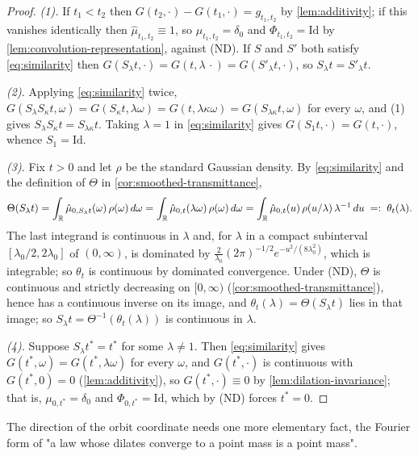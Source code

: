 \begin{proof}
\leanok
\emph{(1).} If $t_1 < t_2$ then $G(t_2,\cdot) - G(t_1,\cdot) = g_{t_1,t_2}$ by
\ref{lem:additivity}; if this vanishes identically then $\hat\mu_{t_1,t_2} \equiv 1$, so
$\mu_{t_1,t_2} = \delta_0$ and $\Phi_{t_1,t_2} = \mathrm{Id}$ by
\ref{lem:convolution-representation}, against (ND). If $S$ and $S'$ both satisfy
\ref{eq:similarity} then $G(S_\lambda t,\cdot) = G(t,\lambda\,\cdot) = G(S'_\lambda t,\cdot)$,
so $S_\lambda t = S'_\lambda t$.

\emph{(2).} Applying \ref{eq:similarity} twice,
$G(S_\lambda S_\kappa t,\omega) = G(S_\kappa t,\lambda\omega) = G(t,\lambda\kappa\omega)
= G(S_{\lambda\kappa}t,\omega)$ for every $\omega$, and (1) gives
$S_\lambda S_\kappa t = S_{\lambda\kappa}t$. Taking $\lambda = 1$ in \ref{eq:similarity} gives
$G(S_1t,\cdot) = G(t,\cdot)$, whence $S_1 = \mathrm{Id}$.

\emph{(3).} Fix $t > 0$ and let $\rho$ be the standard Gaussian density. By
\ref{eq:similarity} and the definition of $\Theta$ in \ref{cor:smoothed-transmittance},
\[
  \Theta(S_\lambda t)
  = \int_{\mathbb{R}} \hat\mu_{0,S_\lambda t}(\omega)\,\rho(\omega)\,d\omega
  = \int_{\mathbb{R}} \hat\mu_{0,t}(\lambda\omega)\,\rho(\omega)\,d\omega
  = \int_{\mathbb{R}} \hat\mu_{0,t}(u)\,\rho(u/\lambda)\,\lambda^{-1}\,du \;=:\; \theta_t(\lambda).
\]
The last integrand is continuous in $\lambda$ and, for $\lambda$ in a compact subinterval
$[\lambda_0/2, 2\lambda_0]$ of $(0,\infty)$, is dominated by
$\tfrac{2}{\lambda_0}(2\pi)^{-1/2}e^{-u^2/(8\lambda_0^2)}$, which is integrable; so $\theta_t$
is continuous by dominated convergence. Under (ND), $\Theta$ is continuous and strictly
decreasing on $[0,\infty)$ (\ref{cor:smoothed-transmittance}), hence has a continuous inverse
on its image, and $\theta_t(\lambda) = \Theta(S_\lambda t)$ lies in that image; so
$S_\lambda t = \Theta^{-1}(\theta_t(\lambda))$ is continuous in $\lambda$.

\emph{(4).} Suppose $S_\lambda t^* = t^*$ for some $\lambda \ne 1$. Then \ref{eq:similarity}
gives $G(t^*,\omega) = G(t^*,\lambda\omega)$ for every $\omega$, and $G(t^*,\cdot)$ is
continuous with $G(t^*,0) = 0$ (\ref{lem:additivity}), so $G(t^*,\cdot) \equiv 0$ by
\ref{lem:dilation-invariance}; that is, $\mu_{0,t^*} = \delta_0$ and
$\Phi_{0,t^*} = \mathrm{Id}$, which by (ND) forces $t^* = 0$.
\end{proof}

The direction of the orbit coordinate needs one more elementary fact, the Fourier form of "a
law whose dilates converge to a point mass is a point mass".

